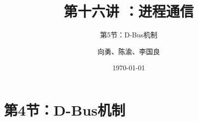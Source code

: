 


\title[第16讲]{第十六讲 ：进程通信} %
\subtitle{第5节：D-Bus机制}
\author{向勇、陈渝、李国良} %
\date{\today} %



\begin{frame}
\titlepage %
\end{frame}

\section{第4节：D-Bus机制} %
